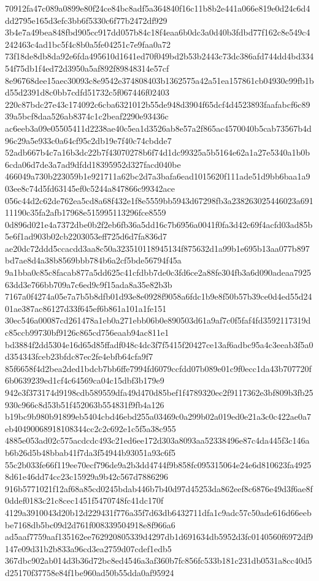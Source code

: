 \documentclass[11pt,a4paper]{article}
\begin{document}
{70912fa47c089a0899e80f24ce84bc8adf5a364840f16c11b8b2e441a066e819e0d24c6d4dd2795e165d3efc3bb6f5330c6f77b2472df929
3b4e7a49bea848fbd905cc917dd057b84c18f4eaa6b0dc3a0d40b3fdbd77f162c8e549c4242463c4ad1bc5f4c8b0a5fe04251c7e9faa0a72
73f18de8db8da92e6fda495610d1641ed70f049bd2b53b2443c73dc386afd744dd4bd33454f75db1f4ed72d3950a5af892f89848314e57cf
8e96768dee15aec30093c8e9542e374808403b1362575a42a51ea157861cb04930c99fb1bd55d2391d8c0bb7cdfd51732c5f067446f02403
220c87bdc27e43c174092c6cba6321012b55de948d3904f65dcf4d4523893faafabcf6c8939a5bcf8daa526ab8374c1c2beaf2290e93436c
ac6eeb3a09e05505411d2238ae40c5ea1d3526ab8e57a2f865ac4570040b5cab73567b4d96c29a5e933c0a64cf95c2db19e7f40c74cbdde7
52adb667b4c7a16b3dc22b7f43070278b6f74d1dc99325a5b5164e62a1a27e5340a1b0b6cda06d7de3a7ad9dfdd18395952d327facd040be
466049a730b223059b1e921711a62bc2d7a3bafa6ead1015620f111ade51d9bb6baa1a903ee8c74d5fd63145ef0c5244a847866c99342ace
056c44d2c62de762ea5cd8a68f432e1f8e5559bb5943d67298fb3a238263025446023a69111190c35fa2afb17968e515995113296fce8559
0d896d021e4a7372dbe0b2f2eb6fb36a5dd16c7b6956a0041f0fa3d42c69f4acfd03ad85b5e6f1ad903b02cb2203053eff725d6d7fa836d7
ae20dc72ddd5ccacdd3aa8c50a323510118945134f875632d1a99b1e695b13aa077b897bd7ae8d4a38b8569bbb784b6a2cf5bde56794f45a
9a1bba0c85c8facab877a5dd625c41cfdbb7de0c3fd6ce2a88fe304fb3a6d090adeaa792563dd3e766bb709a7c6ed9c9f15ada8a35e82b3b
7167a0f4274a05e7a7b5b8dfb01d93e8e0928f9058a6fdc1b9e8f50b57b39ce0d4ed55d2401ae387ac86127d33f645ef6b861a101a1fe151
30ec546a00087cd261478a1eb0a271ebb06b0e890503d61a9af7c0f5faf4fd3592117319dc85ccb99730bf9126c865cd756eaab94ac811e1
bd3884f2dd5304e16d65d85ffadf048c4dc3f7f5415f20427ce13af6adbc95a4c3eeab3f5a0d354343fceb23bfdc87ec2fe4ebfb64cfa9f7
85f6658f4d2bea2ded1bdcb7bb6ffe7994fd6079ccfdd07b089e01c9f0ecc1da43b707720f6b0639239ed1cf4c64569ca04c15dbf3b179e9
942e3f373174d9198cdb589559dfa49d470d85bef1f4789320ec2f9117362e3bf809b3fb25930c966c8d53b51f452063b554831f9fb4a126
b19bc9b980b91899eb5404cbd46ebd255a03469c0a299b02a019ed0e21a3c0c422ae0a7eb40490068918108344cc2c2c692e1c5f5a38c955
4885e053ad02c575acdcdc493c21ed6ee172d303a8093aa52338496e87c4da445f3c146ab6b26d5b48bbab41f7da3f54944b93051a93c6f5
55c2b033fe66f119ee70ecf796de9a2b3dd4744f9b858fc095315064e24e6d810623fa49258d61e46dd74cc23c15929a9b42c567d7886296
916b5771021f12af68a85cd0245bdab446b7b40d97d45253da862eef8c6876e49d3f6ae8f0ddef0183c21c8cec1451f5470748fc41dc170f
4129a3910043d20b12d229431f776a35f7d63db6432711dfa1c9adc57c50ade616d66eebbe7168db5bc09d2d761f008339504918e8f966a6
ad5aaf7759aaf135162ee762920805339d4297db1d691634db5952d3fc0140560f6972df9147e09d31b2b833a96cd3ea2759d07cdef1edb5
367dbc902ab014d3b36d72bc8ed4546a3af360b7fc856fc533b181c231db0531a8cc40d5d25170f37758e84f1be960ad50b55dda0af95924
}
\end{document}
